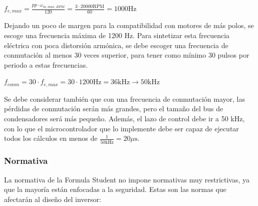 \(f_{e,max} = \frac{pp\cdot \omega_{m, max, RPM}}{120} = \frac{3\cdot 20000 \text{RPM}}{60} = 1000 \text{Hz}\)

Dejando un poco de margen para la compatibilidad con motores de más polos, se escoge una frecuencia máxima de 1200 Hz. Para sintetizar esta frecuencia eléctrica con poca distorsión armónica, se debe escoger una frecuencia de conmutación al menos 30 veces superior, para tener como mínimo 30 pulsos por periodo a estas frecuencias.

\(f_{conm} = 30\cdot f_{e,max} = 30\cdot1200 \text{Hz} = 36 \text{kHz} \rightarrow 50 \text{kHz}\)

Se debe considerar también que con una frecuencia de conmutación mayor, las pérdidas de conmutación serán más grandes, pero el tamaño del bus de condensadores será más pequeño. Además, el lazo de control debe ir a 50 kHz, con lo que el microcontrolador que lo implemente debe ser capaz de ejecutar todos los cálculos en menos de $\frac{1}{50 \text{kHz}} = 20 \mu\text{s}$.

\subsubsection{Normativa}
La normativa de la Formula Student no impone normativas muy restrictivas, ya que la mayoría están enfocadas a la seguridad. Estas son las normas que afectarán al diseño del inversor:

